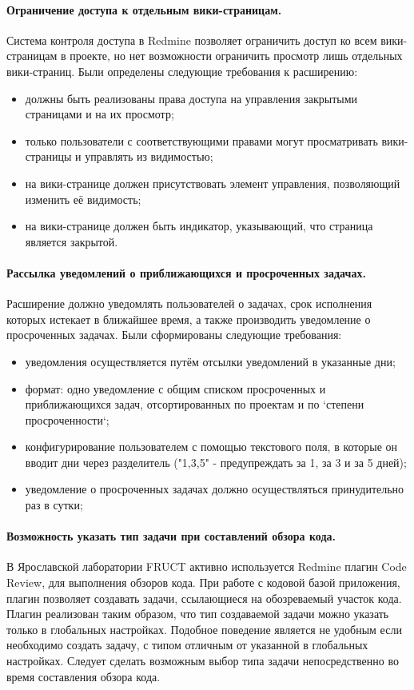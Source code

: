 \paragraph{Ограничение доступа к отдельным вики-страницам.}
\label{definition:private_wiki}
Система контроля доступа в Redmine позволяет ограничить доступ ко всем
вики-страницам в проекте, но нет возможности ограничить просмотр лишь отдельных
вики-страниц. Были определены следующие требования к расширению:
\begin{itemize}
  \item должны быть реализованы права доступа на управления закрытыми
  страницами и на их просмотр;
  \item только пользователи с соответствующими правами могут просматривать
  вики-страницы и управлять из видимостью;   
  \item на вики-странице должен присутствовать элемент управления, позволяющий
  изменить её видимость;
  \item на вики-странице должен быть индикатор, указывающий, что страница
  является закрытой.
\end{itemize}

\paragraph{Рассылка уведомлений о приближающихся и просроченных задачах.}
\label{definition:due_date_reminder}
Расширение должно уведомлять пользователей о задачах, срок исполнения которых
истекает в ближайшее время, а также производить уведомление о просроченных
задачах. Были сформированы следующие требования:
\begin{itemize}
  \item уведомления осуществляется путём отсылки уведомлений в указанные дни;
  \item формат: одно уведомление с общим списком просроченных и приближающихся
  задач, отсортированных по проектам и по `степени просроченности`; 
  \item конфигурирование пользователем с помощью текстового поля, в которые он
  вводит дни через разделитель ("1,3,5" - предупреждать за 1, за 3 и за 5
  дней);
  \item уведомление о просроченных задачах должно осуществляться принудительно
  раз в сутки;
\end{itemize}

\paragraph{Возможность указать тип задачи при составлений обзора кода.}
В Ярославской лаборатории FRUCT активно используется Redmine плагин Code
Review, для выполнения обзоров кода. При работе с кодовой базой приложения,
плагин позволяет создавать задачи, ссылающиеся на обозреваемый участок кода.
Плагин реализован таким образом, что тип создаваемой задачи можно указать
только в глобальных настройках. Подобное поведение является не удобным
если необходимо создать задачу, с типом отличным от указанной в глобальных
настройках. Следует сделать возможным выбор типа задачи непосредственно во
время составления обзора кода.

